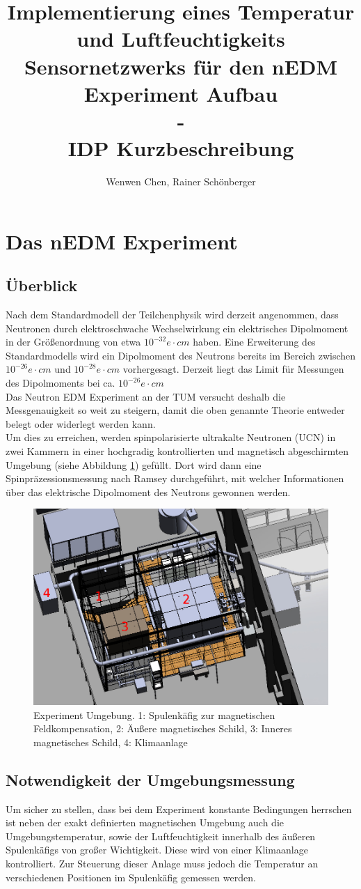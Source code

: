 \documentclass[a4paper]{article} %
\title{Implementierung eines Temperatur und Luftfeuchtigkeits Sensornetzwerks für den nEDM Experiment Aufbau\\-\\IDP Kurzbeschreibung}
\author{Wenwen Chen, Rainer Schönberger}
\begin{document}
\maketitle
\section*{Das nEDM Experiment}
\subsection*{Überblick}
Nach dem Standardmodell der Teilchenphysik wird derzeit angenommen, dass
Neutronen durch elektroschwache Wechselwirkung ein elektrisches Dipolmoment
in der Größenordnung von etwa $10^{-32}e\cdot cm$ haben. Eine Erweiterung des
Standardmodells wird ein Dipolmoment des Neutrons bereits im Bereich zwischen
$10^{-26}e\cdot cm$ und $10^{-28}e\cdot cm$ vorhergesagt. Derzeit liegt das
Limit für Messungen des Dipolmoments bei ca. $10^{-26}e\cdot cm$\\
Das Neutron EDM Experiment an der TUM versucht deshalb die Messgenauigkeit so
weit zu steigern, damit die oben genannte Theorie entweder belegt oder
widerlegt werden kann.\\
Um dies zu erreichen, werden spinpolarisierte ultrakalte Neutronen (UCN) in
zwei Kammern in einer hochgradig kontrollierten und magnetisch abgeschirmten
Umgebung (siehe Abbildung \ref{fig:exp}) gefüllt. Dort wird dann eine
Spin\-präzessions\-messung nach Ramsey
durchgeführt, mit welcher Informationen über das elektrische Dipolmoment des
Neutrons gewonnen werden.
\begin{figure}[h]
\centering
\includegraphics[width=0.7\linewidth]{img/frm3d.png}
\caption{Experiment Umgebung. 1: Spulenkäfig zur magnetischen Feldkompensation,
2: Äußere magnetisches Schild, 3: Inneres magnetisches Schild, 4: Klimaanlage}
\label{fig:exp}
\end{figure}
\subsection*{Notwendigkeit der Umgebungsmessung}
Um sicher zu stellen, dass bei dem Experiment konstante Bedingungen herrschen
ist neben der exakt definierten magnetischen Umgebung auch die 
Umgebungstemperatur, sowie der Luftfeuchtigkeit innerhalb des äußeren
Spulenkäfigs von großer Wichtigkeit. Diese wird von einer Klimaanlage
kontrolliert. Zur Steuer\-ung dieser Anlage muss jedoch die Tempera\-tur an
verschiedenen Positionen im Spulenkäfig gemessen werden.
\end{document}
